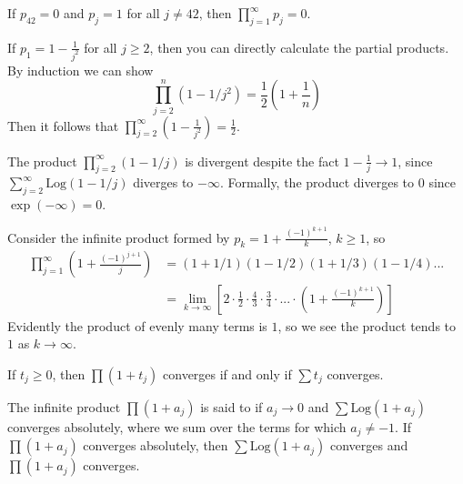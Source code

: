 \begin{example}
    If $p_{42} = 0$ and $p_j = 1$ for all $j \neq 42$, then $\prod_{j=1}^{\infty}p_j = 0$.
\end{example}


\begin{example}
    If $p_1 = 1-\frac{1}{j^2}$ for all $j \geq 2$, then you can directly calculate the partial products. By induction we can show \begin{equation*}
        \prod_{j=2}^n(1-1/j^2) = \frac{1}{2}\left(1+\frac{1}{n}\right)
    \end{equation*}
    Then it follows that $\prod_{j=2}^{\infty}\left(1-\frac{1}{j^2}\right) = \frac{1}{2}$. 
\end{example}

\begin{example}
    The product $\prod_{j=2}^{\infty}(1-1/j)$ is divergent despite the fact $1-\frac{1}{j}\rightarrow 1$, since $\sum_{j=2}^{\infty}\text{Log}(1-1/j)$ diverges to $-\infty$. Formally, the product diverges to $0$ since $\exp(-\infty) = 0$.
\end{example}

\begin{example}
    Consider the infinite product formed by $p_k = 1+\frac{(-1)^{k+1}}{k}$, $k \geq 1$, so \begin{align*}
        \prod_{j=1}^{\infty}\left(1+\frac{(-1)^{j+1}}{j}\right) &= (1+1/1)(1-1/2)(1+1/3)(1-1/4)... \\
        &= \lim\limits_{k\rightarrow \infty}\left[2\cdot \frac{1}{2}\cdot\frac{4}{3}\cdot \frac{3}{4}\cdot ...\cdot \left(1+\frac{(-1)^{k+1}}{k}\right)\right]
    \end{align*}
    Evidently the product of evenly many terms is $1$, so we see the product tends to $1$ as $k\rightarrow \infty$.
\end{example}

\begin{theorem}
    If $t_j \geq 0$, then $\prod(1+t_j)$ converges if and only if $\sum t_j$ converges.
\end{theorem}

\begin{definition}
    The infinite product $\prod(1+a_j)$ is said to  if $a_j\rightarrow 0$ and $\sum\text{Log}(1+a_j)$ converges absolutely, where we sum over the terms for which $a_j \neq -1$. If $\prod(1+a_j)$ converges absolutely, then $\sum\text{Log}(1+a_j)$ converges and $\prod(1+a_j)$ converges.
\end{definition}

